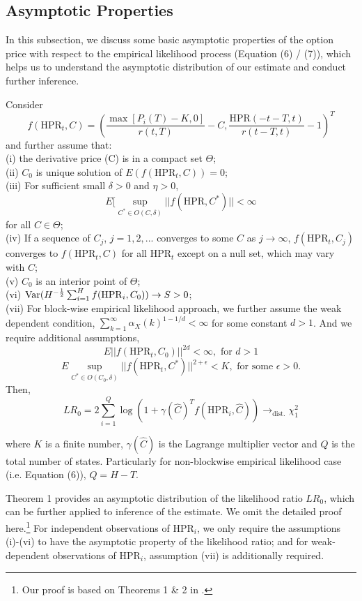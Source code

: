 \subsection{Asymptotic Properties} 
In this subsection, we discuss some basic asymptotic properties of the option price with respect to the empirical likelihood process (Equation (6) / (7)), which helps us to understand the asymptotic distribution of our estimate and conduct further inference.  
\begin{theorem}
Consider 
\[
f(\mathrm{HPR}_t,C)=\left(\frac{\max[P_i(T)-K,0]}{r(t,T)}-C, \frac{\mathrm{HPR}(-t-T,t)}{r(t-T,t)}-1\right)^T
\]
and further assume that:\\
(i) the derivative price (C) is in a compact set $\Theta$; \\
(ii) $C_0$ is unique solution of $E(f(\mathrm{HPR}_t,C))=0$;\\
(iii) For sufficient small $\delta>0$ and $\eta>0$, 
\[
E[\sup_{C^*\in O(C,\delta)}||f(\mathrm{HPR},C^*)||<\infty 
\]
for all $C \in \Theta$;\\
(iv) If a sequence of $C_j$, $j=1,2,...$ converges to some $C$ as $j\rightarrow \infty$, $f(\mathrm{HPR}_t,C_j)$ converges to $f(\mathrm{HPR}_t,C)$ for all $\mathrm{HPR}_t$ except on a null set, which may vary with $C$;\\
(v) $C_0$ is an interior point of $\Theta$;\\
(vi) $\mathrm{Var}(H^{-\frac{1}{2}} \sum_{i=1}^H f(\mathrm{HPR}_i,C_0))\rightarrow S >0$;\\
(vii) For block-wise empirical likelihood approach, we further assume the weak dependent condition, $\sum_{k=1}^\infty \alpha_X(k)^{1-1/d} <\infty$ for some constant $d>1$. And we require additional assumptions, 
\[
E||f(\mathrm{HPR}_t,C_0)||^{2d}<\infty, \text{ for } d>1 
\]  
\[
E \sup_{C^* \in O(C_0,\delta)} ||f(\mathrm{HPR}_t,C^*)||^{2+\epsilon}<K, \text{ for some }\epsilon>0.
\]
Then, 
\[
LR_0=2\sum_{i=1}^Q \log(1+\gamma(\hat{C})^T f(\mathrm{HPR}_i,\hat{C})) \rightarrow_{\mathrm{dist.}}  \chi _1^2
\]
\end{theorem}
where $K$ is a finite number, $\gamma(\hat{C})$ is the Lagrange multiplier vector and $Q$ is the total number of states. Particularly for non-blockwise empirical likelihood case (i.e. Equation (6)), $Q=H-T$.

Theorem 1 provides an asymptotic distribution of the likelihood ratio $LR_0$, which can be further applied to inference of the estimate. We omit the detailed proof here.\footnote{Our proof is based on Theorems 1 \& 2 in \citet{kitamura1997empirical}. } For independent observations of $\mathrm{HPR}_i$, we only require the assumptions (i)-(vi) to have the asymptotic property of the likelihood ratio; and for weak-dependent observations of $\mathrm{HPR}_i$, assumption (vii) is additionally required. 




